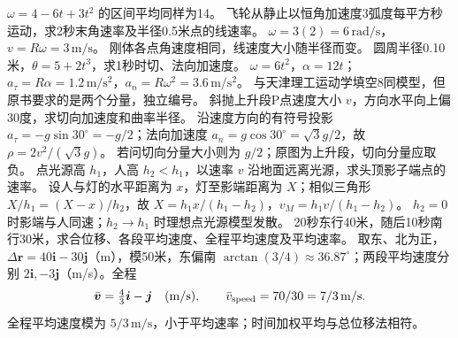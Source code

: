\crosscheck $\omega=4-6t+3t^2$ 的区间平均同样为14。
\problemtext 飞轮从静止以恒角加速度3弧度每平方秒运动，求2秒末角速率及半径0.5米点的线速率。
\workings $\omega=3(2)=6\,\mathrm{rad/s}$，$v=R\omega=3\,\mathrm{m/s}$。
\crosscheck 刚体各点角速度相同，线速度大小随半径而变。
\problemtext 圆周半径0.10米，$\theta=5+2t^3$，求1秒时切、法向加速度。
\workings $\omega=6t^2$，$\alpha=12t$；$a_\tau=R\alpha=1.2\,\mathrm{m/s^2}$，$a_n=R\omega^2=3.6\,\mathrm{m/s^2}$。
\crosscheck 与天津理工运动学填空8同模型，但原书要求的是两个分量，独立编号。
\problemtext 斜抛上升段P点速度大小 $v$，方向水平向上偏30度，求切向加速度和曲率半径。
\workings 沿速度方向的有符号投影 $a_\tau=-g\sin30^\circ=-g/2$；法向加速度 $a_n=g\cos30^\circ=\sqrt3g/2$，故 $\rho=2v^2/(\sqrt3g)$。
\crosscheck 若问切向分量大小则为 $g/2$；原图为上升段，切向分量应取负。
\problemtext 点光源高 $h_1$，人高 $h_2<h_1$，以速率 $v$ 沿地面远离光源，求头顶影子端点的速率。
\workings 设人与灯的水平距离为 $x$，灯至影端距离为 $X$；相似三角形 $X/h_1=(X-x)/h_2$，故 $X=h_1x/(h_1-h_2)$，$v_M=h_1v/(h_1-h_2)$。
\crosscheck $h_2=0$ 时影端与人同速；$h_2\to h_1$ 时理想点光源模型发散。
\problemtext 20秒东行40米，随后10秒南行30米，求合位移、各段平均速度、全程平均速度及平均速率。
\workings 取东、北为正，$\Delta\bm r=40\bm i-30\bm j$（m），模50米，东偏南 $\arctan(3/4)\approx36.87^\circ$；两段平均速度分别 $2\bm i,-3\bm j$（m/s）。全程
\[
\bar{\bm v}=\tfrac43\bm i-\bm j\quad(\mathrm{m/s}),\qquad
\bar v_{\rm speed}=70/30=7/3\,\mathrm{m/s}.
\]
\crosscheck 全程平均速度模为 $5/3\,\mathrm{m/s}$，小于平均速率；时间加权平均与总位移法相符。

